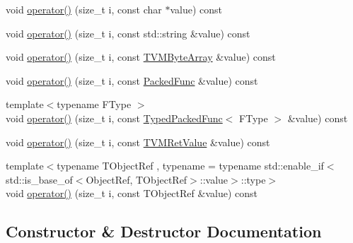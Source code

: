 \begin{DoxyCompactItemize}
\item 
void \hyperlink{classtvm_1_1runtime_1_1TVMArgsSetter_a4fb30f18d2b15ccad43061720eb7f561}{operator()} (size\+\_\+t i, const char $\ast$value) const 
\item 
void \hyperlink{classtvm_1_1runtime_1_1TVMArgsSetter_ab764d801efc097fe2d09c4e9935cc581}{operator()} (size\+\_\+t i, const std\+::string \&value) const 
\item 
void \hyperlink{classtvm_1_1runtime_1_1TVMArgsSetter_acc73129969aab00839e4d50124e0de34}{operator()} (size\+\_\+t i, const \hyperlink{structTVMByteArray}{T\+V\+M\+Byte\+Array} \&value) const 
\item 
void \hyperlink{classtvm_1_1runtime_1_1TVMArgsSetter_a0eff4c00e945424c0a2ca270f627aca4}{operator()} (size\+\_\+t i, const \hyperlink{classtvm_1_1runtime_1_1PackedFunc}{Packed\+Func} \&value) const 
\item 
{\footnotesize template$<$typename F\+Type $>$ }\\void \hyperlink{classtvm_1_1runtime_1_1TVMArgsSetter_a8c90a03541fb6c3f068cc8fccf83762a}{operator()} (size\+\_\+t i, const \hyperlink{classtvm_1_1runtime_1_1TypedPackedFunc}{Typed\+Packed\+Func}$<$ F\+Type $>$ \&value) const 
\item 
void \hyperlink{classtvm_1_1runtime_1_1TVMArgsSetter_a0fbb9197b832b52e3da2fb37643199d9}{operator()} (size\+\_\+t i, const \hyperlink{classtvm_1_1runtime_1_1TVMRetValue}{T\+V\+M\+Ret\+Value} \&value) const 
\item 
{\footnotesize template$<$typename T\+Object\+Ref , typename  = typename std\+::enable\+\_\+if$<$             std\+::is\+\_\+base\+\_\+of$<$\+Object\+Ref, T\+Object\+Ref$>$\+::value$>$\+::type$>$ }\\void \hyperlink{classtvm_1_1runtime_1_1TVMArgsSetter_aa55c2d96af79e07cdf0ca253ec49dc19}{operator()} (size\+\_\+t i, const T\+Object\+Ref \&value) const 
\end{DoxyCompactItemize}


\subsection{Constructor \& Destructor Documentation}
